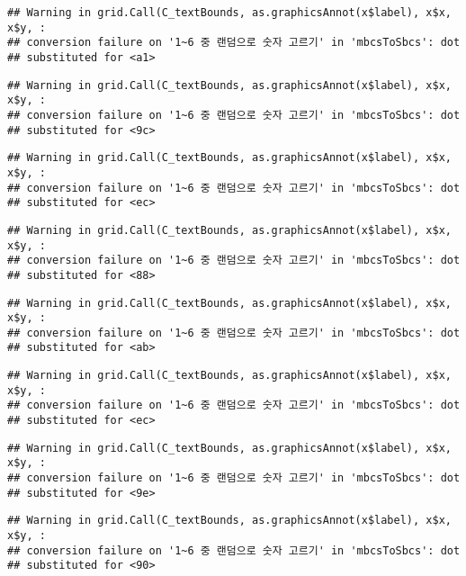 \documentclass[]{book}
\begin{document}
\begin{verbatim}
## Warning in grid.Call(C_textBounds, as.graphicsAnnot(x$label), x$x, x$y, :
## conversion failure on '1~6 중 랜덤으로 숫자 고르기' in 'mbcsToSbcs': dot
## substituted for <a1>
\end{verbatim}

\begin{verbatim}
## Warning in grid.Call(C_textBounds, as.graphicsAnnot(x$label), x$x, x$y, :
## conversion failure on '1~6 중 랜덤으로 숫자 고르기' in 'mbcsToSbcs': dot
## substituted for <9c>
\end{verbatim}

\begin{verbatim}
## Warning in grid.Call(C_textBounds, as.graphicsAnnot(x$label), x$x, x$y, :
## conversion failure on '1~6 중 랜덤으로 숫자 고르기' in 'mbcsToSbcs': dot
## substituted for <ec>
\end{verbatim}

\begin{verbatim}
## Warning in grid.Call(C_textBounds, as.graphicsAnnot(x$label), x$x, x$y, :
## conversion failure on '1~6 중 랜덤으로 숫자 고르기' in 'mbcsToSbcs': dot
## substituted for <88>
\end{verbatim}

\begin{verbatim}
## Warning in grid.Call(C_textBounds, as.graphicsAnnot(x$label), x$x, x$y, :
## conversion failure on '1~6 중 랜덤으로 숫자 고르기' in 'mbcsToSbcs': dot
## substituted for <ab>
\end{verbatim}

\begin{verbatim}
## Warning in grid.Call(C_textBounds, as.graphicsAnnot(x$label), x$x, x$y, :
## conversion failure on '1~6 중 랜덤으로 숫자 고르기' in 'mbcsToSbcs': dot
## substituted for <ec>
\end{verbatim}

\begin{verbatim}
## Warning in grid.Call(C_textBounds, as.graphicsAnnot(x$label), x$x, x$y, :
## conversion failure on '1~6 중 랜덤으로 숫자 고르기' in 'mbcsToSbcs': dot
## substituted for <9e>
\end{verbatim}

\begin{verbatim}
## Warning in grid.Call(C_textBounds, as.graphicsAnnot(x$label), x$x, x$y, :
## conversion failure on '1~6 중 랜덤으로 숫자 고르기' in 'mbcsToSbcs': dot
## substituted for <90>
\end{verbatim}
\end{document}
